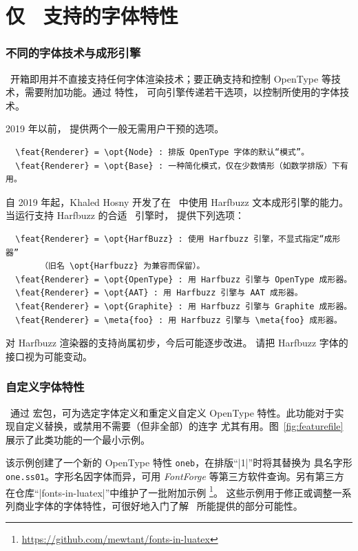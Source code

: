 \documentclass[a4paper]{l3doc}
\begin{document}
\part{仅 \LuaTeX\ 支持的字体特性}
\label{sec:luatex-features}

\section{不同的字体技术与成形引擎}
\label{sec:renderer-luatex}

\LuaTeX\ 开箱即用并不直接支持任何字体渲染技术；要正确支持和控制
OpenType 等技术，需要附加功能。通过  特性，
可向引擎传递若干选项，以控制所使用的字体技术。

2019 年以前， 提供两个一般无需用户干预的选项。

\begin{Verbatim}
  \feat{Renderer} = \opt{Node} : 排版 OpenType 字体的默认“模式”。
  \feat{Renderer} = \opt{Base} : 一种简化模式，仅在少数情形（如数学排版）下有用。
\end{Verbatim}

自 2019 年起，Khaled Hosny 开发了在 \LuaTeX\ 中使用 Harfbuzz
文本成形引擎的能力。当运行支持 Harfbuzz 的合适 \LuaTeX\ 引擎时，
 提供下列选项：

\begin{Verbatim}
  \feat{Renderer} = \opt{HarfBuzz} : 使用 Harfbuzz 引擎，不显式指定“成形器”
       （旧名 \opt{Harfbuzz} 为兼容而保留）。
  \feat{Renderer} = \opt{OpenType} : 用 Harfbuzz 引擎与 OpenType 成形器。
  \feat{Renderer} = \opt{AAT} : 用 Harfbuzz 引擎与 AAT 成形器。
  \feat{Renderer} = \opt{Graphite} : 用 Harfbuzz 引擎与 Graphite 成形器。
  \feat{Renderer} = \meta{foo} : 用 Harfbuzz 引擎与 \meta{foo} 成形器。
\end{Verbatim}

对 Harfbuzz 渲染器的支持尚属初步，今后可能逐步改进。
请把 Harfbuzz 字体的接口视为可能变动。

\section{自定义字体特性}

\LuaTeX\ 通过  宏包，可为选定字体定义和重定义自定义
OpenType 特性。此功能对于实现自定义替换，或禁用不需要（但非全部）的连字
尤其有用。图~\ref{fig:featurefile} 展示了此类功能的一个最小示例。

该示例创建了一个新的 OpenType 特性 \texttt{oneb}，在排版“|1|”时将其替换为
具名字形 \texttt{one.ss01}。字形名因字体而异，可用 \emph{FontForge}
等第三方软件查询。另有第三方在仓库“|fonts-in-luatex|”中维护了一批附加示例
\footnote{\url{https://github.com/mewtant/fonts-in-luatex}}。
这些示例用于修正或调整一系列商业字体的字体特性，可很好地入门了解
\LuaTeX\ 所能提供的部分可能性。
\end{document}
